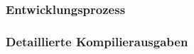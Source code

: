 \documentclass[paper=a4,fontsize=12pt,ngerman]{scrartcl}
\begin{document}
\subsubsection{Entwicklungsprozess}

\subsubsection{Detaillierte Kompilierausgaben}


\clearpage
\renewcommand\refname{Literaturverzeichnis}




\clearpage
\end{document}
